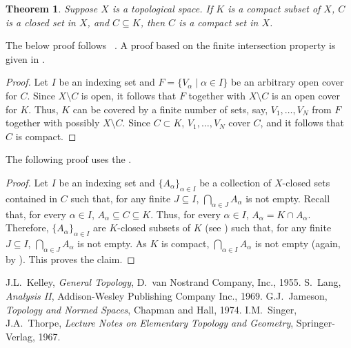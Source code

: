 \documentclass[12pt]{article}
\newtheorem{thm}{Theorem}
\begin{document}
\begin{thm}
Suppose $X$ is a topological space.  If $K$ is a compact subset of $X$, $C$ is a closed set in $X$, and $C \subseteq K$, then $C$ is a compact set in $X$.
\end{thm}

The below proof follows ~\cite{jameson}.  A proof based on the finite intersection property is given in \cite{singer}.

\begin{proof}
Let $I$ be an indexing set and $F=\{ V_\alpha \mid \alpha \in I\}$ be an arbitrary open cover for $C$. Since $X\setminus C$ is open, it follows that $F$ together with $X\setminus C$ is an open cover for $K$. Thus, $K$ can be covered by a finite number of sets, say, $V_1, \ldots, V_N$ from $F$ together with possibly $X\setminus C$. Since $C\subset K$, $V_1, \ldots, V_N$ cover $C$, and it follows that $C$ is compact.
\end{proof}

The following proof uses the .

\begin{proof}
Let $I$ be an indexing set and $\{A_{\alpha}\}_{\alpha \in I}$ be a collection of $X$-closed sets contained in $C$ such that, for any finite $J \subseteq I$, $\displaystyle \bigcap_{\alpha \in J} A_{\alpha}$ is not empty.  Recall that, for every $\alpha \in I$, $A_{\alpha} \subseteq C\subseteq K$.  Thus, for every $\alpha \in I$, $A_{\alpha}= K\cap A_{\alpha}$.  Therefore, $\{A_{\alpha}\}_{\alpha \in I}$ are $K$-closed subsets of $K$ (see ) such that, for any finite $J \subseteq I$, $\displaystyle \bigcap_{\alpha \in J} A_{\alpha}$ is not empty.  As $K$ is compact, $\displaystyle \bigcap_{\alpha \in I} A_{\alpha}$ is not empty (again, by ).
This proves the claim.
\end{proof}

\begin{thebibliography}{9}
 J.L.~Kelley, \emph{General Topology}, D.~van Nostrand Company, Inc., 1955.
 S.~Lang, \emph{Analysis II},
 Addison-Wesley Publishing Company Inc., 1969.
  G.J.~Jameson, \emph{Topology and Normed Spaces},
 Chapman and Hall, 1974.
 I.M.~Singer, J.A.~Thorpe,
 \emph{Lecture Notes on Elementary Topology and Geometry},
 Springer-Verlag, 1967.
\end{thebibliography}
\end{document}
